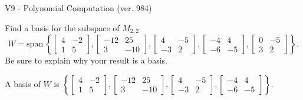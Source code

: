 \begin{exercise}
  \begin{exerciseTitle}V9 - Polynomial Computation (ver. 984)\end{exerciseTitle}
  \begin{exerciseStatement}
    Find a basis for the subspace of \(M_{2,2}\) 
\[W=\mathrm{span}\ \left\{\left[\begin{array}{cc}
4 & -2 \\
1 & 5
\end{array}\right] , \left[\begin{array}{cc}
-12 & 25 \\
3 & -10
\end{array}\right] , \left[\begin{array}{cc}
4 & -5 \\
-3 & 2
\end{array}\right] , \left[\begin{array}{cc}
-4 & 4 \\
-6 & -5
\end{array}\right] , \left[\begin{array}{cc}
0 & -5 \\
3 & 2
\end{array}\right]\right\}.\]
 Be sure to explain why your result is a basis.


  \end{exerciseStatement}
  \begin{exerciseAnswer}
   A basis of \(W\) is  \(\left\{\left[\begin{array}{cc}
4 & -2 \\
1 & 5
\end{array}\right] , \left[\begin{array}{cc}
-12 & 25 \\
3 & -10
\end{array}\right] , \left[\begin{array}{cc}
4 & -5 \\
-3 & 2
\end{array}\right] , \left[\begin{array}{cc}
-4 & 4 \\
-6 & -5
\end{array}\right]\right\}\).
  


  \end{exerciseAnswer}
\end{exercise}